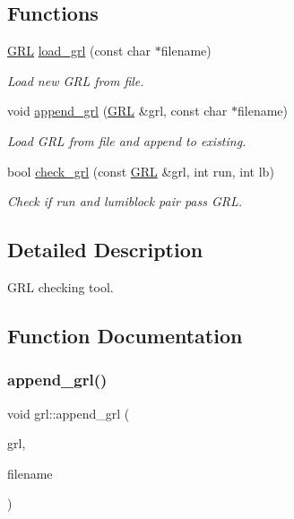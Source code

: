 \subsection*{Functions}
\begin{DoxyCompactItemize}
\item 
\mbox{\hyperlink{namespacegrl_a16e314a8a6edc3eeb64c6e8770ffafec}{G\+RL}} \mbox{\hyperlink{namespacegrl_a57ca0b364998e60e0ee31ebc6978fb22}{load\+\_\+grl}} (const char $\ast$filename)
\begin{DoxyCompactList}\small\item\em Load new G\+RL from file. \end{DoxyCompactList}\item 
void \mbox{\hyperlink{namespacegrl_ab4ec34f297cf2434abf0340bf6f62732}{append\+\_\+grl}} (\mbox{\hyperlink{namespacegrl_a16e314a8a6edc3eeb64c6e8770ffafec}{G\+RL}} \&grl, const char $\ast$filename)
\begin{DoxyCompactList}\small\item\em Load G\+RL from file and append to existing. \end{DoxyCompactList}\item 
bool \mbox{\hyperlink{namespacegrl_a33d1097eae8f11e74d75b716b3fe6bea}{check\+\_\+grl}} (const \mbox{\hyperlink{namespacegrl_a16e314a8a6edc3eeb64c6e8770ffafec}{G\+RL}} \&grl, int run, int lb)
\begin{DoxyCompactList}\small\item\em Check if run and lumiblock pair pass G\+RL. \end{DoxyCompactList}\end{DoxyCompactItemize}


\subsection{Detailed Description}
G\+RL checking tool. 

\subsection{Function Documentation}
\mbox{\label{namespacegrl_ab4ec34f297cf2434abf0340bf6f62732}} 
\subsubsection{\texorpdfstring{append\+\_\+grl()}{append\_grl()}}
{\footnotesize\ttfamily void grl\+::append\+\_\+grl (\begin{DoxyParamCaption}\item[{\mbox{\hyperlink{namespacegrl_a16e314a8a6edc3eeb64c6e8770ffafec}{G\+RL}} \&}]{grl,  }\item[{const char $\ast$}]{filename }\end{DoxyParamCaption})}



